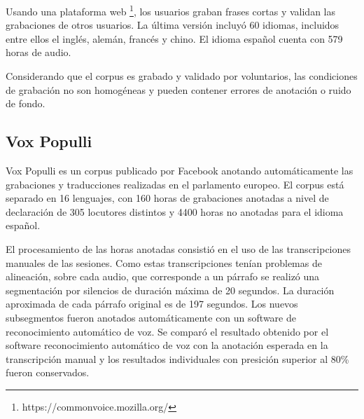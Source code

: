 Usando una plataforma web \footnote{https://commonvoice.mozilla.org/}, los usuarios graban frases cortas y validan las grabaciones de otros usuarios. La última versión  incluyó 60 idiomas, incluidos entre ellos el inglés, alemán, francés y chino. El idioma español cuenta con 579 horas de audio.

Considerando que el corpus es grabado y validado por voluntarios, las condiciones de grabación no son homogéneas y pueden contener errores de anotación o ruido de fondo.

\subsection{Vox Populli}

Vox Populli \cite{voxpopulli} es un corpus publicado por Facebook anotando automáticamente las grabaciones y traducciones realizadas en el parlamento europeo. El corpus está separado en 16 lenguajes, con 160 horas de grabaciones anotadas a nivel de declaración de 305 locutores distintos y 4400 horas no anotadas para el idioma español. 

El procesamiento de las horas anotadas consistió en el uso de las transcripciones manuales de las sesiones. Como estas transcripciones tenían problemas de alineación, sobre cada audio, que corresponde a un párrafo se realizó una segmentación por silencios de duración máxima de 20 segundos. La duración aproximada de cada párrafo original es de 197 segundos. Los nuevos subsegmentos fueron anotados automáticamente con un software de reconocimiento automático de voz. Se comparó el resultado obtenido por el software reconocimiento automático de voz con la anotación esperada en la transcripción manual y los resultados individuales con presición superior al 80\% fueron conservados.